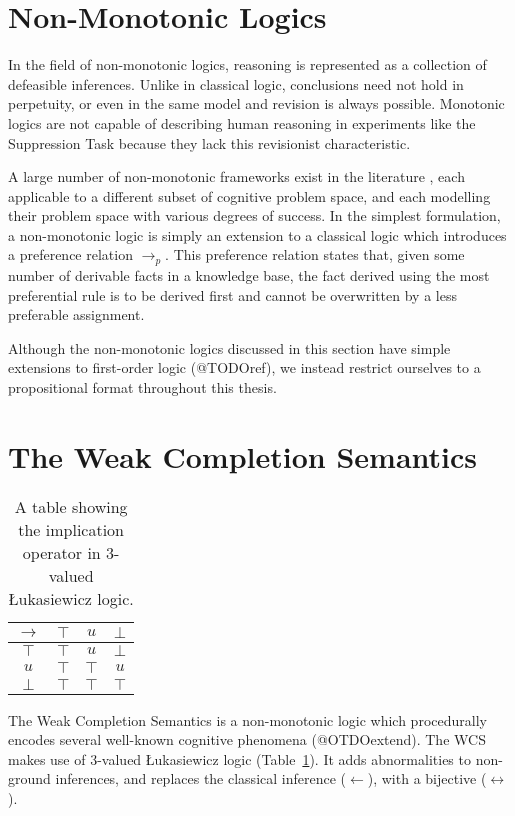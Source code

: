 \section{Non-Monotonic Logics}
In the field of non-monotonic logics, reasoning is represented as a collection of defeasible inferences. Unlike in classical logic, conclusions need not hold in perpetuity, or even in the same model and revision is always possible. Monotonic logics are not capable of describing human reasoning in experiments like the Suppression Task \citep{dietz2012computational} because they lack this revisionist characteristic.

A large number of non-monotonic frameworks exist in the literature \citep{mcdermott1980non}, each applicable to a different subset of cognitive problem space, and each modelling their problem space with various degrees of success. In the simplest formulation, a non-monotonic logic is simply an extension to a classical logic which introduces a preference relation $\rightarrow_p$. This preference relation states that, given some number of derivable facts in a knowledge base, the fact derived using the most preferential rule is to be derived first and cannot be overwritten by a less preferable assignment.  

Although the non-monotonic logics discussed in this section have simple extensions to first-order logic (@TODOref), we instead restrict ourselves to a propositional format throughout this thesis.
\section{The Weak Completion Semantics}
\begin{table}
\begin{center}
\begin{tabular}{ c | c c c }
  $\rightarrow$& $\top$ & $u$ & $\bot$ \\ \hline
 $\top$ & $\top$ & $u$ & $\bot$ \\  
 $u$ & $\top$ & $\top$ & $u$\\  
 $\bot$ & $\top$ & $\top$ & $\top$
\end{tabular}
\caption{A table showing the implication operator in 3-valued \L ukasiewicz logic.}
\label{tbl:luk}
\end{center}
\end{table}

The Weak Completion Semantics is a non-monotonic logic which procedurally encodes several well-known cognitive phenomena (@OTDOextend). The WCS makes use of 3-valued \L ukasiewicz logic (Table~\ref{tbl:luk}). It adds abnormalities to non-ground inferences, and replaces the classical inference ($\leftarrow$), with a bijective ($\leftrightarrow$). 

